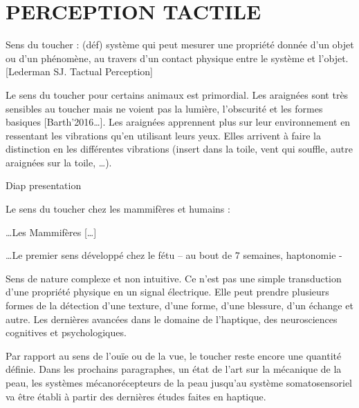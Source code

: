 \chapter{PERCEPTION TACTILE}
Sens du toucher : (déf) système qui peut mesurer une propriété donnée d’un objet ou d’un phénomène, au travers d’un contact physique entre le système et l’objet. [Lederman SJ. Tactual Perception]\par
Le sens du toucher pour certains animaux est primordial. Les araignées sont très sensibles au toucher mais ne voient pas la lumière, l’obscurité et les formes basiques [Barth’2016…]. Les araignées apprennent plus sur leur environnement en ressentant les vibrations qu’en utilisant leurs yeux. Elles arrivent à faire la distinction en les différentes vibrations (insert dans la toile, vent qui souffle, autre araignées sur la toile, …).\par
Diap presentation\par
Le sens du toucher chez les mammifères et humains :\par
…Les Mammifères […]\par
…Le premier sens développé chez le fétu – au bout de 7 semaines, haptonomie - \par
Sens de nature complexe et non intuitive. Ce n’est pas une simple transduction d’une propriété physique en un signal électrique. Elle peut prendre plusieurs formes de la détection d’une texture, d’une forme, d’une blessure, d’un échange et autre. Les dernières avancées dans le domaine de l’haptique, des neurosciences cognitives et psychologiques.\par
Par rapport au sens de l’ouïe ou de la vue, le toucher reste encore une quantité définie. Dans les prochains paragraphes, un état de l’art sur la mécanique de la peau, les systèmes mécanorécepteurs de la peau jusqu’au système somatosensoriel va être établi à partir des dernières études faites en haptique.\par









